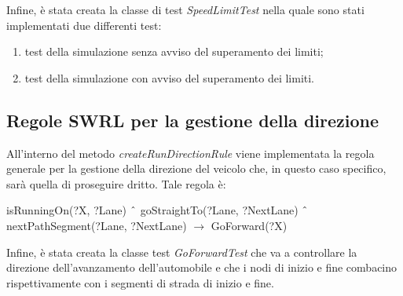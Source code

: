 Infine, \`e stata creata la classe di test \textit{SpeedLimitTest} nella quale sono stati implementati due differenti test:
\begin{enumerate}
\item test della simulazione senza avviso del superamento dei limiti;
\item test della simulazione con avviso del superamento dei limiti.
\end{enumerate}
\subsection{Regole SWRL per la gestione della direzione}\label{SWRLrundirection}
All'interno del metodo \textit{createRunDirectionRule} viene implementata la regola generale per la gestione della direzione del veicolo che, in questo caso specifico, sar\`a quella di proseguire dritto.
Tale regola \`e:
\begin{center}
isRunningOn(?X, ?Lane) $\char`\^$ goStraightTo(?Lane, ?NextLane) $\char`\^$ nextPathSegment(?Lane, ?NextLane) $\rightarrow$ GoForward(?X)
\end{center}

Infine, \`e stata creata la classe test \textit{GoForwardTest} che va a controllare la direzione dell'avanzamento dell'automobile e che i nodi di inizio e fine combacino rispettivamente con i segmenti di strada di inizio e fine. 
